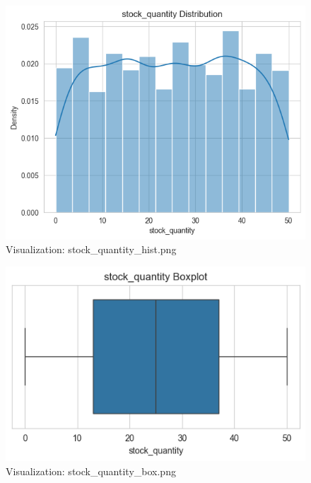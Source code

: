 \documentclass{article}%
\begin{document}
\vspace{10pt}%
\\%
\begin{minipage}[c]{0.48\textwidth}%


\begin{figure}[H]%
\centering%
\includegraphics[width=\linewidth]{output/plots/stock_quantity_hist.png}%
\caption{Visualization: stock\_quantity\_hist.png}%
\end{figure}

%
\end{minipage}%
\begin{minipage}[c]{0.48\textwidth}%


\begin{figure}[H]%
\centering%
\includegraphics[width=\linewidth]{output/plots/stock_quantity_box.png}%
\caption{Visualization: stock\_quantity\_box.png}%
\end{figure}

%
\end{minipage}%
\end{document}
